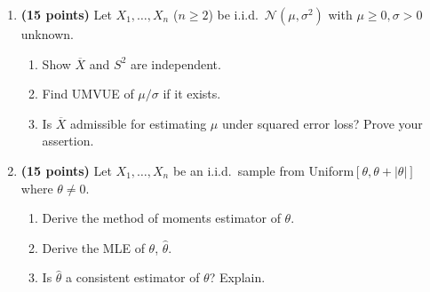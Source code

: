 \documentclass[11pt,a4paper]{article}
\begin{document}
\begin{enumerate}[label=\textbf{\arabic*.}]
    \item \textbf{(15 points)} Let $X_1, \dots, X_n$ ($n \ge 2$) be i.i.d.\ $\mathcal{N}(\mu, \sigma^2)$ with $\mu \ge 0, \sigma > 0$ unknown.
    \begin{enumerate}[label=(\alph*)]
        \item Show $\overline{X}$ and $S^2$ are independent.
        \item Find UMVUE of $\mu / \sigma$ if it exists.
        \item Is $\overline{X}$ admissible for estimating $\mu$ under squared error loss? Prove your assertion.
    \end{enumerate}

    \item \textbf{(15 points)} Let $X_1, \dots, X_n$ be an i.i.d.\ sample from Uniform$[\theta, \theta + |\theta|]$ where $\theta \neq 0$.
    \begin{enumerate}[label=(\alph*)]
        \item Derive the method of moments estimator of $\theta$.
        \item Derive the MLE of $\theta$, $\hat{\theta}$.
        \item Is $\hat{\theta}$ a consistent estimator of $\theta$? Explain.
    \end{enumerate}
\end{enumerate}
\end{document}
